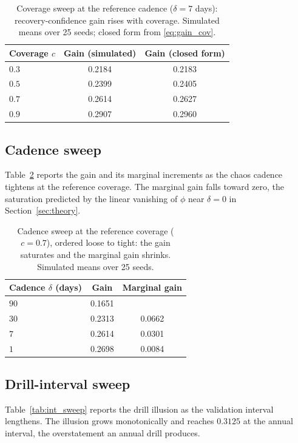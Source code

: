 \documentclass[journal]{IEEEtran}
\begin{document}
\begin{table}[t]
\centering
\caption{Coverage sweep at the reference cadence ($\delta = 7$ days): recovery-confidence gain rises
with coverage. Simulated means over 25 seeds; closed form from \eqref{eq:gain_cov}.}
\label{tab:cov_sweep}
\footnotesize
\setlength{\tabcolsep}{6pt}
\begin{tabular}{@{}lcc@{}}
\toprule
Coverage $c$ & Gain (simulated) & Gain (closed form) \\
\midrule
$0.3$ & 0.2184 & 0.2183 \\
$0.5$ & 0.2399 & 0.2405 \\
$0.7$ & 0.2614 & 0.2627 \\
$0.9$ & 0.2907 & 0.2960 \\
\bottomrule
\end{tabular}
\end{table}

\subsection{Cadence sweep}
Table~\ref{tab:cad_sweep} reports the gain and its marginal increments as the chaos cadence tightens
at the reference coverage. The marginal gain falls toward zero, the saturation predicted by the
linear vanishing of $\phi$ near $\delta = 0$ in Section~\ref{sec:theory}.

\begin{table}[t]
\centering
\caption{Cadence sweep at the reference coverage ($c = 0.7$), ordered loose to tight: the gain
saturates and the marginal gain shrinks. Simulated means over 25 seeds.}
\label{tab:cad_sweep}
\footnotesize
\setlength{\tabcolsep}{6pt}
\begin{tabular}{@{}lcc@{}}
\toprule
Cadence $\delta$ (days) & Gain & Marginal gain \\
\midrule
$90$ & 0.1651 & \\
$30$ & 0.2313 & 0.0662 \\
$7$  & 0.2614 & 0.0301 \\
$1$  & 0.2698 & 0.0084 \\
\bottomrule
\end{tabular}
\end{table}

\subsection{Drill-interval sweep}
Table~\ref{tab:int_sweep} reports the drill illusion as the validation interval lengthens. The
illusion grows monotonically and reaches $0.3125$ at the annual interval, the overstatement an annual
drill produces.
\end{document}
